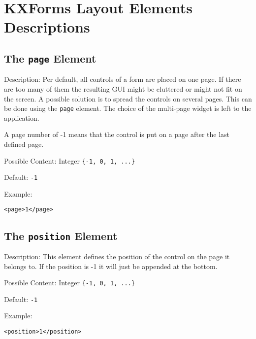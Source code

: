 



\pagebreak 
\section{ KXForms Layout Elements Descriptions}
\label{layoutelements}




\subsection{ The \texttt{page} Element}
\label{page}
\begin{description}
 \item Description: Per default, all controls of a form are placed on one page. If there are too many of them the resulting GUI might be cluttered or might not fit on the screen. A possible solution is to spread the controls on several pages. This can be done using the \texttt{page} element. The choice of the multi-page widget is left to the application. 

A page number of -1 means that the control is put on a page after the last defined page.

 \item Possible Content: Integer \texttt{\{-1, 0, 1, ...\}}

 \item Default: \texttt{-1}

 \item Example: 

\begin{lstlisting}[caption=\texttt{page} Element]
<page>1</page>
\end{lstlisting}
\end{description}




\subsection{ The \texttt{position} Element}
\label{position}
\begin{description}
 \item Description: This element defines the position of the control on the page it belongs to. If the position is -1 it will just be appended at the bottom.

 \item Possible Content: Integer \texttt{\{-1, 0, 1, ...\}}

 \item Default: \texttt{-1}

 \item Example: 

\begin{lstlisting}[caption=\texttt{position} Element]
<position>1</position>
\end{lstlisting}
\end{description}




